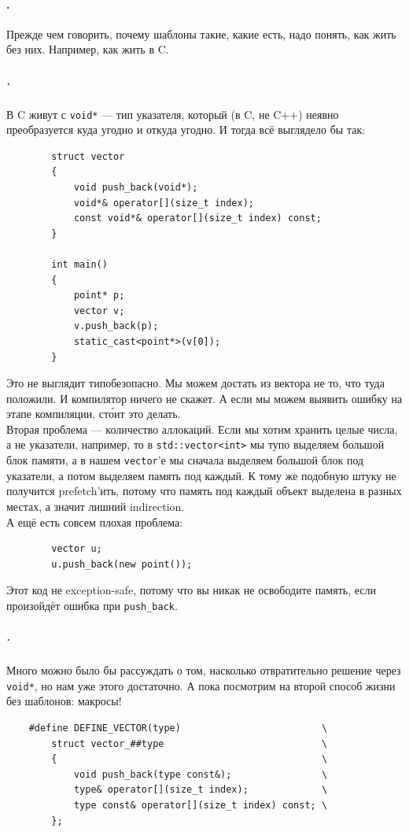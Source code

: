 \documentclass{article}
\begin{document}
    \paragraph{.}
    Прежде чем говорить, почему шаблоны такие, какие есть, надо понять, как жить без них. Например, как жить в C.
    \subparagraph{.}
    В C живут с \texttt{void*} --- тип указателя, который (в C, не C++) неявно преобразуется куда угодно и откуда угодно. И тогда всё выглядело бы так:
    \begin{verbatim}
        struct vector
        {
            void push_back(void*);
            void*& operator[](size_t index);
            const void*& operator[](size_t index) const;
        }

        int main()
        {
            point* p;
            vector v;
            v.push_back(p);
            static_cast<point*>(v[0]);
        }
    \end{verbatim}
    Это не выглядит типобезопасно. Мы можем достать из вектора не то, что туда положили. И компилятор ничего не скажет. А если мы можем выявить ошибку на этапе компиляции, ст\'{о}ит это делать.\\
    Вторая проблема --- количество аллокаций. Если мы хотим хранить целые числа, а не указатели, например, то в \texttt{std::vector<int>} мы тупо выделяем большой блок памяти, а в нашем \texttt{vector}'е мы сначала выделяем большой блок под указатели, а потом выделяем память под каждый. К тому же подобную штуку не получится prefetch'ить, потому что память под каждый объект выделена в разных местах, а значит лишний indirection.\\
    А ещё есть совсем плохая проблема:
    \begin{verbatim}
        vector u;
        u.push_back(new point());
    \end{verbatim}
    Этот код не exception-safe, потому что вы никак не освободите память, если произойдёт ошибка при \texttt{push_back}.
    \subparagraph{.}
    Много можно было бы рассуждать о том, насколько отвратительно решение через \texttt{void*}, но нам уже этого достаточно. А пока посмотрим на второй способ жизни без шаблонов: макросы!
    \begin{verbatim}
    #define DEFINE_VECTOR(type)                         \
        struct vector_##type                            \
        {                                               \
            void push_back(type const&);                \
            type& operator[](size_t index);             \
            type const& operator[](size_t index) const; \
        };
    \end{verbatim}
\end{document}
